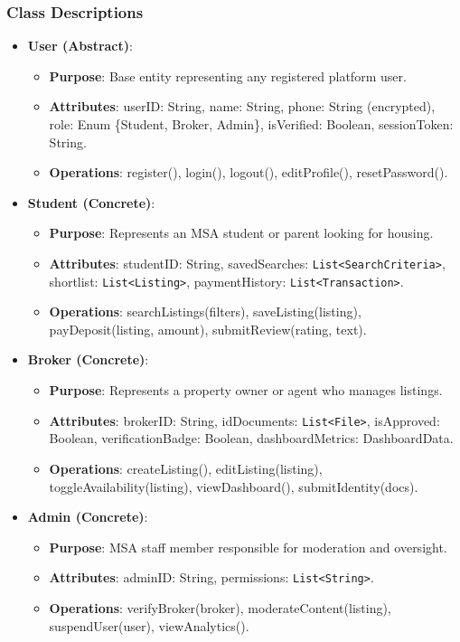 \documentclass[12pt,a4paper]{article}
\begin{document}
\subsubsection{Class Descriptions}
\begin{itemize}[leftmargin=0.5cm]
    \item \textbf{User (Abstract)}: 
    \begin{itemize}
        \item \textbf{Purpose}: Base entity representing any registered platform user.
        \item \textbf{Attributes}: userID: String, name: String, phone: String (encrypted), role: Enum \{Student, Broker, Admin\}, isVerified: Boolean, sessionToken: String.
        \item \textbf{Operations}: register(), login(), logout(), editProfile(), resetPassword().
    \end{itemize}
    
    \item \textbf{Student (Concrete)}: 
    \begin{itemize}
        \item \textbf{Purpose}: Represents an MSA student or parent looking for housing.
        \item \textbf{Attributes}: studentID: String, savedSearches: \texttt{List<SearchCriteria>}, shortlist: \texttt{List<Listing>}, paymentHistory: \texttt{List<Transaction>}.
        \item \textbf{Operations}: searchListings(filters), saveListing(listing), payDeposit(listing, amount), submitReview(rating, text).
    \end{itemize}
    
    \item \textbf{Broker (Concrete)}: 
    \begin{itemize}
        \item \textbf{Purpose}: Represents a property owner or agent who manages listings.
        \item \textbf{Attributes}: brokerID: String, idDocuments: \texttt{List<File>}, isApproved: Boolean, verificationBadge: Boolean, dashboardMetrics: DashboardData.
        \item \textbf{Operations}: createListing(), editListing(listing), toggleAvailability(listing), viewDashboard(), submitIdentity(docs).
    \end{itemize}
    
    \item \textbf{Admin (Concrete)}: 
    \begin{itemize}
        \item \textbf{Purpose}: MSA staff member responsible for moderation and oversight.
        \item \textbf{Attributes}: adminID: String, permissions: \texttt{List<String>}.
        \item \textbf{Operations}: verifyBroker(broker), moderateContent(listing), suspendUser(user), viewAnalytics().
    \end{itemize}
    

\end{itemize}
\end{document}
